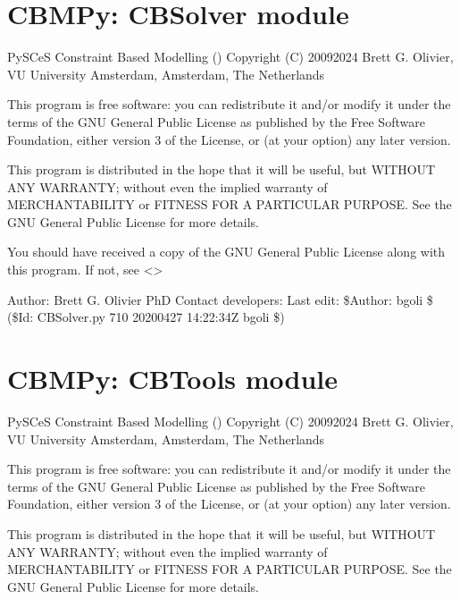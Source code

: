 \documentclass[letterpaper,10pt,english]{sphinxmanual}
\begin{document}
\section{CBMPy: CBSolver module}
\label{\detokenize{modules_doc:cbmpy-cbsolver-module}}
\sphinxAtStartPar
PySCeS Constraint Based Modelling ()
Copyright (C) 2009\sphinxhyphen{}2024 Brett G. Olivier, VU University Amsterdam, Amsterdam, The Netherlands

\sphinxAtStartPar
This program is free software: you can redistribute it and/or modify
it under the terms of the GNU General Public License as published by
the Free Software Foundation, either version 3 of the License, or
(at your option) any later version.

\sphinxAtStartPar
This program is distributed in the hope that it will be useful,
but WITHOUT ANY WARRANTY; without even the implied warranty of
MERCHANTABILITY or FITNESS FOR A PARTICULAR PURPOSE.  See the
GNU General Public License for more details.

\sphinxAtStartPar
You should have received a copy of the GNU General Public License
along with this program.  If not, see \textless{}\textgreater{}

\sphinxAtStartPar
Author: Brett G. Olivier PhD
Contact developers: 
Last edit: \$Author: bgoli \$ (\$Id: CBSolver.py 710 2020\sphinxhyphen{}04\sphinxhyphen{}27 14:22:34Z bgoli \$)
\label{\detokenize{modules_doc:module-cbmpy.CBTools}}

\section{CBMPy: CBTools module}
\label{\detokenize{modules_doc:cbmpy-cbtools-module}}
\sphinxAtStartPar
PySCeS Constraint Based Modelling ()
Copyright (C) 2009\sphinxhyphen{}2024 Brett G. Olivier, VU University Amsterdam, Amsterdam, The Netherlands

\sphinxAtStartPar
This program is free software: you can redistribute it and/or modify
it under the terms of the GNU General Public License as published by
the Free Software Foundation, either version 3 of the License, or
(at your option) any later version.

\sphinxAtStartPar
This program is distributed in the hope that it will be useful,
but WITHOUT ANY WARRANTY; without even the implied warranty of
MERCHANTABILITY or FITNESS FOR A PARTICULAR PURPOSE.  See the
GNU General Public License for more details.
\end{document}
